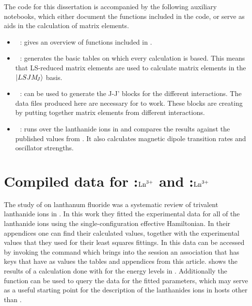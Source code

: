 \documentclass[11pt, twoside,openright]{article}
\begin{document}
The code for this dissertation is accompanied by the following auxiliary \mathematica notebooks, which either document the  functions included in the code, or serve as aids in the  calculation of matrix elements.

\begin{itemize}
	\item \faFloppyO\,\, : gives an overview of functions included in \qlanth.
	\item \faFloppyO\,\, : generates the basic tables on which every calculation is based. This means that LS-reduced matrix elements are used to calculate matrix elements in the $|LSJM_{\!{J}}\rangle$ basis.
	\item \faFloppyO\,\, : can be used to generate the J-J' blocks for the different interactions. The data files produced here are necessary for  to work. These blocks are creating by putting together matrix elements from different interactions.
	\item \faFloppyO\,\, : runs \qlanth over the lanthanide ions in \LaFthree and compares the results against the published values from \bill. It also calculates magnetic dipole transition rates and oscillator strengths.
\end{itemize}

\section{Compiled data for \LaFthree:$\textrm{Ln}^{3+}$ and \liyorite:$\textrm{Ln}^{3+}$}\label{section:data}

The study of \bill on lanthanum fluoride was a systematic review of trivalent lanthanide ions in \LaFthree. In this work they fitted the experimental data for all of the lanthanide ions using the single-configuration effective Hamiltonian. In their appendices one can find their calculated values, together with the experimental values that they used for their least squares fittings. In \qlanth this data can be accessed by invoking the command  which brings into the session an association that has keys that have as values the tables and appendices from this article.  shows the results of a calculation done with \qlanth for the energy levels in \LaFthree. Additionally the function  can be used to query the data for the fitted parameters, which may serve as a useful starting point for the description of the lanthanides ions in hosts other than \LaFthree.
\end{document}
